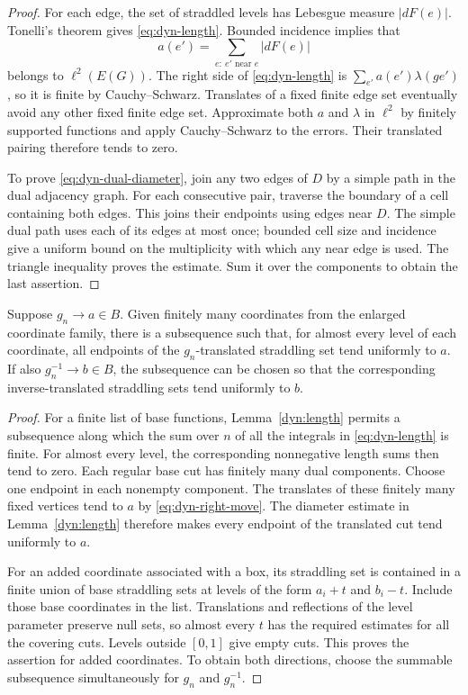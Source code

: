 \begin{proof}
For each edge, the set of straddled levels has Lebesgue measure
$|dF(e)|$. Tonelli's theorem gives \eqref{eq:dyn-length}. Bounded
incidence implies that
\[
 a(e')=\sum_{e:\ e'\text{ near }e}|dF(e)|
\]
belongs to $\ell^2(E(G))$. The right side of
\eqref{eq:dyn-length} is $\sum_{e'}a(e')\lambda(ge')$, so it is finite
by Cauchy--Schwarz. Translates of a fixed finite edge set eventually
avoid any other fixed finite edge set. Approximate both $a$ and
$\lambda$ in $\ell^2$ by finitely supported functions and apply
Cauchy--Schwarz to the errors. Their translated pairing therefore
tends to zero.

To prove \eqref{eq:dyn-dual-diameter}, join any two edges of $D$ by a
simple path in the dual adjacency graph. For each consecutive pair,
traverse the boundary of a cell containing both edges. This joins
their endpoints using edges near $D$. The simple dual path uses each
of its edges at most once; bounded cell size and incidence give a
uniform bound on the multiplicity with which any near edge is used.
The triangle inequality proves the estimate. Sum it over the
components to obtain the last assertion.
\end{proof}

\begin{lemma}\label{dyn:walls}
Suppose $g_n\to a\in B$. Given finitely many coordinates from the
enlarged coordinate family, there is a subsequence such that, for
almost every level of each coordinate, all endpoints of the
$g_n$-translated straddling set tend uniformly to $a$.
If also $g_n^{-1}\to b\in B$, the subsequence can be chosen so that the
corresponding inverse-translated straddling sets tend uniformly to $b$.
\end{lemma}

\begin{proof}
For a finite list of base functions, Lemma~\ref{dyn:length} permits a
subsequence along which the sum over $n$ of all the integrals in
\eqref{eq:dyn-length} is finite. For almost every level, the
corresponding nonnegative length sums then tend to zero. Each regular
base cut has finitely many dual components. Choose one endpoint in
each nonempty component. The translates of these finitely many fixed
vertices tend to $a$ by \eqref{eq:dyn-right-move}. The diameter estimate
in Lemma~\ref{dyn:length} therefore makes every endpoint of the
translated cut tend uniformly to $a$.

For an added coordinate associated with a box, its straddling set is
contained in a finite union of base straddling sets at levels of the
form $a_i+t$ and $b_i-t$. Include those base coordinates in the list.
Translations and reflections of the level parameter preserve null
sets, so almost every $t$ has the required estimates for all the
covering cuts. Levels outside $[0,1]$ give empty cuts. This proves the
assertion for added coordinates. To obtain both directions, choose
the summable subsequence simultaneously for $g_n$ and $g_n^{-1}$.
\end{proof}

